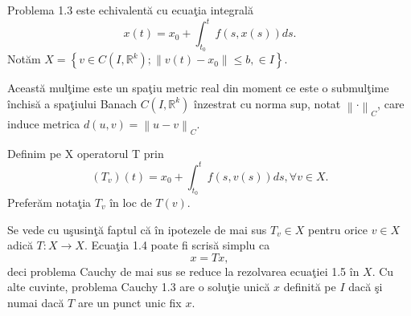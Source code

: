 \documentclass[a4paper,12pt,oneside]{report}
\begin{document}
Problema 1.3 este echivalent\u{a} cu ecua\c{t}ia integral\u{a}
\begin{displaymath}
  x\left ( t \right ) = x_{0} + \int_{t_{0}}^{t}f\left ( s,x\left ( s \right ) \right ) ds. \label{eq:1.4} \tag{1.4}
\end{displaymath}
Not\u{a}m \(X = \left \{ v \in C \left ( I, \mathbb{R}^{k} \right ); \left \| v\left ( t \right ) -x_{0}\right \| \leq b, \in I\right \}.\)

Aceast\u{a} mul\c{t}ime este un spa\c{t}iu metric real din moment ce este o submul\c{t}ime \^{i}nchis\u{a} a spa\c{t}iului Banach  \(C \left ( I, \mathbb{R}^{k} \right )\) \^{i}nzestrat cu norma sup, notat \(\left \| \cdot  \right \|_{C}\), care induce metrica \(d\left ( u,v \right ) = \left \| u-v \right \|_{C}\).

Definim pe X operatorul T prin
\begin{displaymath}
  \left ( T_{v} \right )\left ( t \right ) = x_{0} + \int_{t_{0}}^{t}f\left ( s,v\left ( s \right ) \right ) ds, \forall v \in X.
\end{displaymath}
Prefer\u{a}m nota\c{t}ia \(T_{v}\) \^{i}n loc de \(T\left ( v \right ).\)

Se vede cu u\c{s}usin\c{t}\u{a} faptul c\u{a} \^{i}n ipotezele de mai sus \(T_{v} \in X\) pentru orice \(v \in X\) adic\u{a} \(T : X \rightarrow X.\) Ecua\c{t}ia 1.4 poate fi scris\u{a} simplu ca
\begin{displaymath}
  x = Tx, \label{eq:1.5} \tag{1.5}
\end{displaymath}
deci problema Cauchy de mai sus se reduce la rezolvarea ecua\c{t}iei 1.5 \^{i}n \(X\). Cu alte cuvinte, problema Cauchy 1.3 are o solu\c{t}ie unic\u{a} \(x\) definit\u{a} pe \(I\) dac\u{a} \c{s}i numai dac\u{a} \(T\) are un punct unic fix \(x\).
\end{document}
